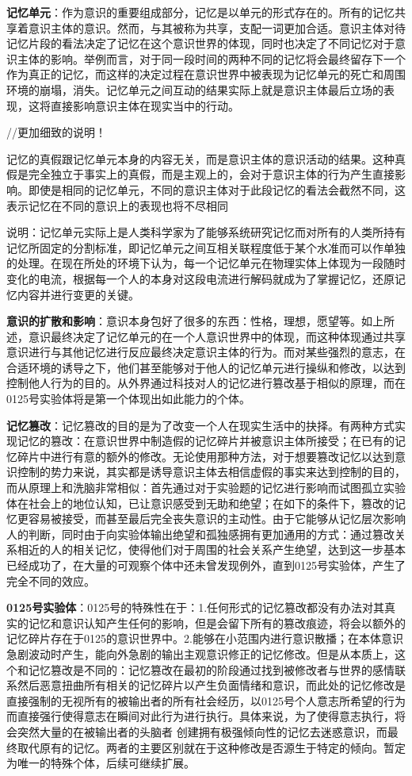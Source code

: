 \documentclass[12pt, a4paper]{article}
\begin{document}
        \medskip
        \textbf{记忆单元}：作为意识的重要组成部分，记忆是以单元的形式存在的。所有的记忆共享着意识主体的意识。然而，与其被称为共享，支配一词更加合适。意识主体对待记忆片段的看法决定了记忆在这个意识世界的体现，同时也决定了不同记忆对于意识主体的影响。举例而言，对于同一段时间的两种不同的记忆将会最终留存下一个作为真正的记忆，而这样的决定过程在意识世界中被表现为记忆单元的死亡和周围环境的崩塌，消失。记忆单元之间互动的结果实际上就是意识主体最后立场的表现，这将直接影响意识主体在现实当中的行动。 

        //更加细致的说明！

        记忆的真假跟记忆单元本身的内容无关，而是意识主体的意识活动的结果。这种真假是完全独立于事实上的真假，而是主观上的，会对于意识主体的行为产生直接影响。即使是相同的记忆单元，不同的意识主体对于此段记忆的看法会截然不同，这表示记忆在不同的意识上的表现也将不尽相同

        说明：记忆单元实际上是人类科学家为了能够系统研究记忆而对所有的人类所持有记忆所固定的分割标准，即记忆单元之间互相关联程度低于某个水准而可以作单独的处理。在现在所处的环境下认为，每一个记忆单元在物理实体上体现为一段随时变化的电流，根据每一个人的本身对这段电流进行解码就成为了掌握记忆，还原记忆内容并进行变更的关键。

        \medskip
        \textbf{意识的扩散和影响}：意识本身包好了很多的东西：性格，理想，愿望等。如上所述，意识最终决定了记忆单元的在一个人意识世界中的体现，而这种体现通过共享意识进行与其他记忆进行反应最终决定意识主体的行为。而对某些强烈的意志，在合适环境的诱导之下，他们甚至能够对于他人的记忆单元进行操纵和修改，以达到控制他人行为的目的。从外界通过科技对人的记忆进行篡改基于相似的原理，而在0125号实验体将是第一个体现出如此能力的个体。

        \medskip
        \textbf{记忆篡改}：记忆篡改的目的是为了改变一个人在现实生活中的抉择。有两种方式实现记忆的篡改：在意识世界中制造假的记忆碎片并被意识主体所接受；在已有的记忆碎片中进行有意的额外的修改。无论使用那种方法，对于想要篡改记忆以达到意识控制的势力来说，其实都是诱导意识主体去相信虚假的事实来达到控制的目的，而从原理上和洗脑非常相似：首先通过对于实验题的记忆进行影响而试图孤立实验体在社会上的地位认知，已让意识感受到无助和绝望；在如下的条件下，篡改的记忆更容易被接受，而甚至最后完全丧失意识的主动性。由于它能够从记忆层次影响人的判断，同时由于向实验体输出绝望和孤独感拥有更加通用的方式：通过篡改关系相近的人的相关记忆，使得他们对于周围的社会关系产生绝望，达到这一步基本已经成功了，在大量的可观察个体中还未曾发现例外，直到0125号实验体，产生了完全不同的效应。
        
        \textbf{0125号实验体}：0125号的特殊性在于：1.任何形式的记忆篡改都没有办法对其真实的记忆和意识认知产生任何的影响，但是会留下所有的篡改痕迹，将会以额外的记忆碎片存在于0125的意识世界中。2.能够在小范围内进行意识散播；在本体意识急剧波动时产生，能向外急剧的输出主观意识修正的记忆修改。但是从本质上，这个和记忆篡改是不同的：记忆篡改在最初的阶段通过找到被修改者与世界的感情联系然后恶意扭曲所有相关的记忆碎片以产生负面情绪和意识，而此处的记忆修改是直接强制的无视所有的被输出者的所有社会经历，以0125号个人意志所希望的行为而直接强行使得意志在瞬间对此行为进行执行。具体来说，为了使得意志执行，将会突然大量的在被输出者的头脑者 创建拥有极强倾向性的记忆去迷惑意识，而最终取代原有的记忆。两者的主要区别就在于这种修改是否源生于特定的倾向。暂定为唯一的特殊个体，后续可继续扩展。
\end{document}
